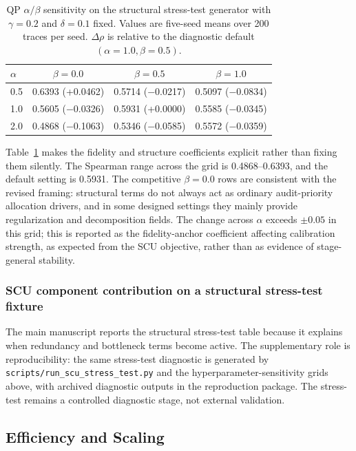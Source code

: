 \documentclass[a4paper,fleqn]{cas-sc}
\begin{document}
\begin{table}[ht]
\caption{QP $\alpha/\beta$ sensitivity on the structural stress-test generator with $\gamma=0.2$ and $\delta=0.1$ fixed. Values are five-seed means over 200 traces per seed. $\Delta\rho$ is relative to the diagnostic default $(\alpha=1.0,\beta=0.5)$.}
\label{tab:supp-alpha-beta-sensitivity}
\centering
\small
\begin{tabular}{lccc}
\toprule
\textbf{$\alpha$} & \textbf{$\beta=0.0$} & \textbf{$\beta=0.5$} & \textbf{$\beta=1.0$} \\
\midrule
0.5 & 0.6393 (+0.0462) & 0.5714 ($-$0.0217) & 0.5097 ($-$0.0834) \\
1.0 & 0.5605 ($-$0.0326) & 0.5931 (+0.0000) & 0.5585 ($-$0.0345) \\
2.0 & 0.4868 ($-$0.1063) & 0.5346 ($-$0.0585) & 0.5572 ($-$0.0359) \\
\bottomrule
\end{tabular}
\end{table}

Table~\ref{tab:supp-alpha-beta-sensitivity} makes the fidelity and structure coefficients explicit rather than fixing them silently. The Spearman range across the grid is 0.4868--0.6393, and the default setting is 0.5931. The competitive $\beta=0.0$ rows are consistent with the revised framing: structural terms do not always act as ordinary audit-priority allocation drivers, and in some designed settings they mainly provide regularization and decomposition fields. The change across $\alpha$ exceeds $\pm 0.05$ in this grid; this is reported as the fidelity-anchor coefficient affecting calibration strength, as expected from the SCU objective, rather than as evidence of stage-general stability.

\subsubsection{SCU component contribution on a structural stress-test fixture}

The main manuscript reports the structural stress-test table because it explains when redundancy and bottleneck terms become active. The supplementary role is reproducibility: the same stress-test diagnostic is generated by \texttt{scripts/run\_scu\_stress\_test.py} and the hyperparameter-sensitivity grids above, with archived diagnostic outputs in the reproduction package. The stress-test remains a controlled diagnostic stage, not external validation.

\subsection{Efficiency and Scaling}
\label{app:efficiency-scaling}
\end{document}
